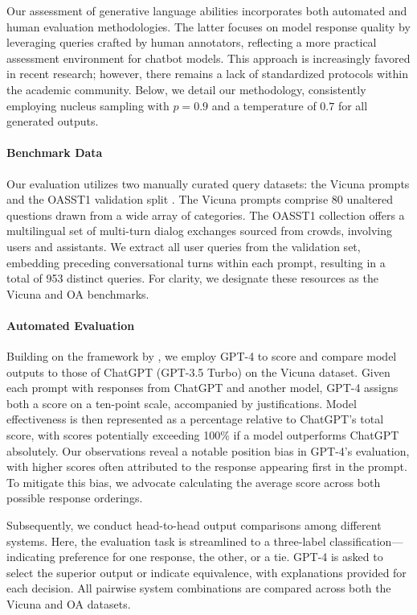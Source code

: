Our assessment of generative language abilities incorporates both automated and human evaluation methodologies. The latter focuses on model response quality by leveraging queries crafted by human annotators, reflecting a more practical assessment environment for chatbot models. This approach is increasingly favored in recent research; however, there remains a lack of standardized protocols within the academic community. Below, we detail our methodology, consistently employing nucleus sampling with $p=0.9$ and a temperature of $0.7$ for all generated outputs.

\paragraph{Benchmark Data} Our evaluation utilizes two manually curated query datasets: the Vicuna prompts \citep{vicuna2023} and the OASST1 validation split \citep{kopf2023openassistant}. The Vicuna prompts comprise 80 unaltered questions drawn from a wide array of categories. The OASST1 collection offers a multilingual set of multi-turn dialog exchanges sourced from crowds, involving users and assistants. We extract all user queries from the validation set, embedding preceding conversational turns within each prompt, resulting in a total of 953 distinct queries. For clarity, we designate these resources as the Vicuna and OA benchmarks.

\paragraph{Automated Evaluation} Building on the framework by \citet{vicuna2023}, we employ GPT-4 to score and compare model outputs to those of ChatGPT (GPT-3.5 Turbo) on the Vicuna dataset. Given each prompt with responses from ChatGPT and another model, GPT-4 assigns both a score on a ten-point scale, accompanied by justifications. Model effectiveness is then represented as a percentage relative to ChatGPT’s total score, with scores potentially exceeding 100\% if a model outperforms ChatGPT absolutely. Our observations reveal a notable position bias in GPT-4’s evaluation, with higher scores often attributed to the response appearing first in the prompt. To mitigate this bias, we advocate calculating the average score across both possible response orderings.

Subsequently, we conduct head-to-head output comparisons among different systems. Here, the evaluation task is streamlined to a three-label classification—indicating preference for one response, the other, or a tie. GPT-4 is asked to select the superior output or indicate equivalence, with explanations provided for each decision. All pairwise system combinations are compared across both the Vicuna and OA datasets.

